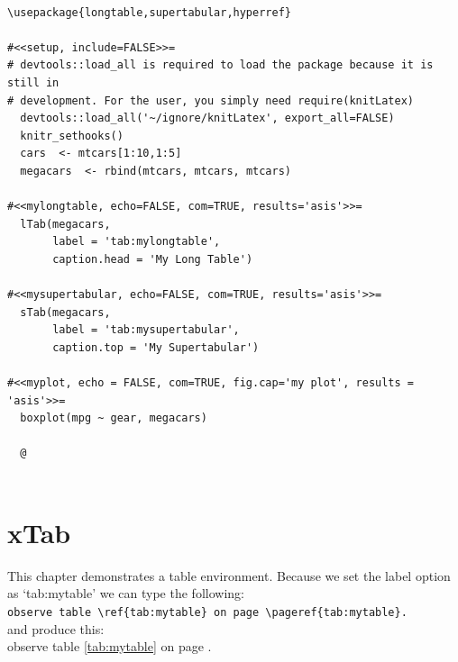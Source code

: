 \documentclass{report}\usepackage[]{graphicx}\usepackage[]{color}
\begin{document}
\begin{verbatim}

\usepackage{longtable,supertabular,hyperref}

#<<setup, include=FALSE>>=
# devtools::load_all is required to load the package because it is still in
# development. For the user, you simply need require(knitLatex)
  devtools::load_all('~/ignore/knitLatex', export_all=FALSE)
  knitr_sethooks()
  cars  <- mtcars[1:10,1:5]
  megacars  <- rbind(mtcars, mtcars, mtcars)

#<<mylongtable, echo=FALSE, com=TRUE, results='asis'>>=
  lTab(megacars,
       label = 'tab:mylongtable',
       caption.head = 'My Long Table')

#<<mysupertabular, echo=FALSE, com=TRUE, results='asis'>>=
  sTab(megacars,
       label = 'tab:mysupertabular',
       caption.top = 'My Supertabular')

#<<myplot, echo = FALSE, com=TRUE, fig.cap='my plot', results = 'asis'>>=
  boxplot(mpg ~ gear, megacars)

  @
  
\end{verbatim}

\chapter{xTab}

This chapter demonstrates a table environment. Because we set the label option
as `tab:mytable' we can type the following:\\

\noindent
\verb|observe table \ref{tab:mytable} on page \pageref{tab:mytable}.|\\

\noindent
and produce this:\\

\noindent
observe table \ref{tab:mytable} on page \pageref{tab:mytable}.
\end{document}
